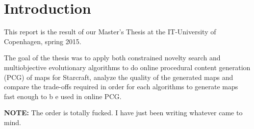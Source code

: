 \section{Introduction}
\label{Intro}

This report is the result of our Master's Thesis at the IT-University of Copenhagen, spring 2015.

The goal of the thesis was to apply both constrained novelty search and multiobjective evolutionary algorithms to do online procedural content generation (PCG) of maps for Starcraft, analyze the quality of the generated maps and compare the trade-offs required in order for each algorithms to generate maps fast enough to b e used in online PCG.

\textbf{NOTE:} The order is totally fucked. I have just been writing whatever came to mind.